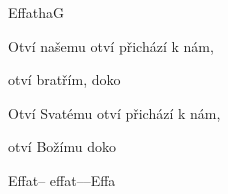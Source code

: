 \setcounter{page}{105}
\begin{song}{Effatha}{G}{}
\begin{SBChorus*}
Otví našemu  otví přichází k nám,

otví bratřím,  doko

Otví Svatému  otví přichází k nám, 

otví Božímu  doko 

Effat-- effat----Effa
\end{SBChorus*}
\end{song}
